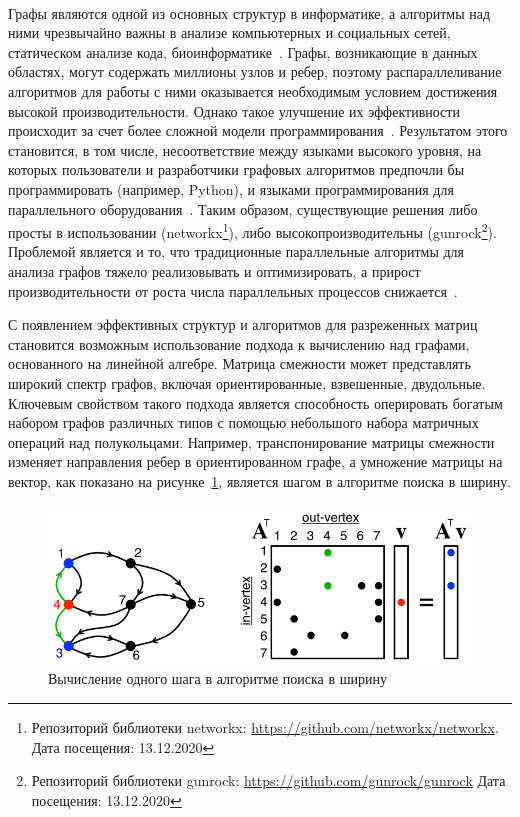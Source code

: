 \paragraph{}
Графы являются одной из основных структур в информатике, а алгоритмы над ними чрезвычайно важны в анализе компьютерных и социальных сетей, статическом анализе кода, биоинформатике~\cite{gb_math}. Графы, возникающие в данных областях, могут содержать миллионы узлов и ребер, поэтому распараллеливание алгоритмов для работы с ними оказывается необходимым условием достижения высокой производительности. Однако такое улучшение их эффективности происходит за счет более сложной модели программирования~\cite{blast}. Результатом этого становится, в том числе, несоответствие между языками высокого уровня, на которых пользователи и разработчики графовых алгоритмов предпочли бы программировать (например, Python), и языками программирования для параллельного оборудования~\cite{blast}. Таким образом, существующие решения либо просты в использовании (networkx\footnote{Репозиторий библиотеки networkx: \url{https://github.com/networkx/networkx}. Дата посещения: 13.12.2020}), либо высокопроизводительны (gunrock\footnote{Репозиторий библиотеки gunrock: \url{https://github.com/gunrock/gunrock} Дата посещения: 13.12.2020}). Проблемой является и то, что традиционные параллельные алгоритмы для анализа графов тяжело реализовывать и оптимизировать, а прирост производительности от роста числа параллельных процессов снижается~\cite{gb_math}. 

С появлением эффективных структур и алгоритмов для разреженных матриц становится возможным использование подхода к вычислению над графами, основанного на линейной алгебре. Матрица смежности может представлять широкий спектр графов, включая ориентированные, взвешенные, двудольные. Ключевым свойством такого подхода является способность оперировать богатым набором графов различных типов с помощью небольшого набора матричных операций над полукольцами. Например, транспонирование матрицы смежности изменяет направления ребер в ориентированном графе, а умножение матрицы на вектор, как показано на рисунке~\ref{fig:bfs_step}, является шагом в алгоритме поиска в ширину.

\begin{figure}[h!]
    \centering
    \includegraphics[width=0.9\linewidth]{pictures/MatrixBFS.png}
    \caption{Вычисление одного шага в алгоритме поиска в ширину\footnotemark}
    \label{fig:bfs_step}
\end{figure}

